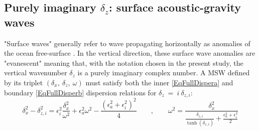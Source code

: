\subsection{Purely imaginary $\delta_z$: surface acoustic-gravity waves}
\label{SubSectionGraphicMSW}
"Surface waves" generally refer to wave propagating horizontally as anomalies of the ocean free-surface \citep{gill_1982}. In the vertical direction, these surface wave anomalies are "evanescent" meaning that, with the notation chosen in the present study, the vertical wavenumber $\delta_z$ is a purely imaginary complex number.
A MSW defined by its triplet $(\delta_x,\ \delta_z,\ \omega)$ must satisfy both the inner \ref{EqFullDispera} and boundary \ref{EqFullDisperb} dispersion relations for $\delta_z\ =\ i\ \delta_{z,i}$:
\begin{equation}
\delta_x^2-\delta_{z,i}^2 =\epsilon_i^2\frac{\delta_x^2}
{\omega^2}+\epsilon_a^2\omega^2-\frac{(\epsilon_a^2+\epsilon_i^2)^2}{4} \qquad , \qquad
\omega^2=\frac{\delta_x^2}
{\frac{\delta_{z,i}}{\tanh(\delta_{z,i})}+\frac{\epsilon_a^2+\epsilon_i^2}{2}}
\label{rappel-eqs-complex}
\end{equation}
